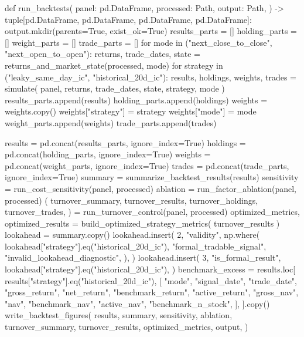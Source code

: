 \documentclass[UTF8,a4paper,fontset=fandol]{ctexart}
\begin{document}
\begin{ProjectCode}
def run_backtests(
    panel: pd.DataFrame,
    processed: Path,
    output: Path,
) -> tuple[pd.DataFrame, pd.DataFrame, pd.DataFrame, pd.DataFrame]:
    output.mkdir(parents=True, exist_ok=True)
    results_parts = []
    holding_parts = []
    weight_parts = []
    trade_parts = []
    for mode in ("next_close_to_close", "next_open_to_open"):
        returns, trade_dates, state = returns_and_market_state(processed, mode)
        for strategy in ("leaky_same_day_ic", "historical_20d_ic"):
            results, holdings, weights, trades = simulate(
                panel, returns, trade_dates, state, strategy, mode
            )
            results_parts.append(results)
            holding_parts.append(holdings)
            weights = weights.copy()
            weights["strategy"] = strategy
            weights["mode"] = mode
            weight_parts.append(weights)
            trade_parts.append(trades)

    results = pd.concat(results_parts, ignore_index=True)
    holdings = pd.concat(holding_parts, ignore_index=True)
    weights = pd.concat(weight_parts, ignore_index=True)
    trades = pd.concat(trade_parts, ignore_index=True)
    summary = summarize_backtest_results(results)
    sensitivity = run_cost_sensitivity(panel, processed)
    ablation = run_factor_ablation(panel, processed)
    (
        turnover_summary,
        turnover_results,
        turnover_holdings,
        turnover_trades,
    ) = run_turnover_control(panel, processed)
    optimized_metrics, optimized_results = build_optimized_strategy_metrics(
        turnover_results
    )
    lookahead = summary.copy()
    lookahead.insert(
        2,
        "validity",
        np.where(
            lookahead["strategy"].eq("historical_20d_ic"),
            "formal_tradable_signal",
            "invalid_lookahead_diagnostic",
        ),
    )
    lookahead.insert(
        3,
        "is_formal_result",
        lookahead["strategy"].eq("historical_20d_ic"),
    )
    benchmark_excess = results.loc[
        results["strategy"].eq("historical_20d_ic"),
        [
            "mode",
            "signal_date",
            "trade_date",
            "gross_return",
            "net_return",
            "benchmark_return",
            "active_return",
            "gross_nav",
            "nav",
            "benchmark_nav",
            "active_nav",
            "benchmark_n_stock",
        ],
    ].copy()
    write_backtest_figures(
        results,
        summary,
        sensitivity,
        ablation,
        turnover_summary,
        turnover_results,
        optimized_metrics,
        output,
    )


\end{ProjectCode}
\end{document}
